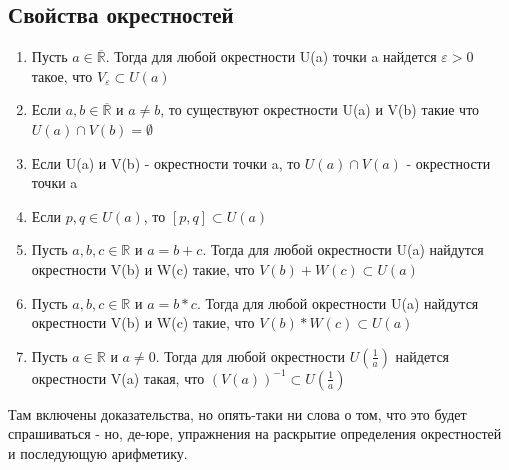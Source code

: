 \documentclass[10pt, a4paper,twocolumn]{article}
\begin{document}
\subsection{Свойства окрестностей}
\begin{enumerate}
    \item Пусть $a \in \overline{\mathbb{R}}$. Тогда для любой окрестности U(a) точки a найдется $\varepsilon > 0$ такое, что $V_{\varepsilon} \subset U(a)$
    \item Если $a, b \in \overline{\mathbb{R}}$ и $a \neq b$, то существуют окрестности U(a) и V(b) такие что $U(a) \cap V(b) =  \emptyset$
    \item Если U(a) и V(b) - окрестности точки a, то $U(a) \cap V(a)$ - окрестности точки a
    \item Если $p, q \in U(a)$, то $[p, q] \subset U(a)$
    \item Пусть $a, b, c \in \mathbb{R}$ и $a = b + c$. Тогда для любой окрестности U(a) найдутся окрестности V(b) и W(c) такие, что $V(b) + W(c) \subset U(a)$
    \item Пусть $a, b, c \in \mathbb{R}$ и $a = b * c$. Тогда для любой окрестности U(a) найдутся окрестности V(b) и W(c) такие, что $V(b) * W(c) \subset U(a)$
    \item Пусть $a \in \mathbb{R}$ и $a \neq 0$. Тогда для любой окрестности $U(\frac{1}{a})$ найдется окрестности V(a) такая, что $(V(a))^{-1} \subset U(\frac{1}{a})$
\end{enumerate}
Там включены доказательства, но опять-таки ни слова о том, что это будет спрашиваться - но, де-юре, упражнения на раскрытие определения окрестностей и последующую арифметику.
\end{document}
